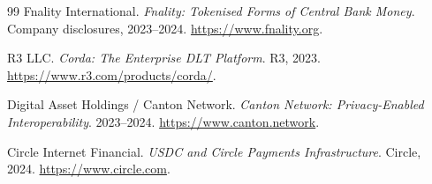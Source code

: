 \documentclass[11pt,a4paper]{article}
\begin{document}
\begin{thebibliography}{99}
Fnality International. \textit{Fnality: Tokenised Forms of Central Bank Money}. Company disclosures, 2023--2024. \url{https://www.fnality.org}.

R3 LLC. \textit{Corda: The Enterprise DLT Platform}. R3, 2023. \url{https://www.r3.com/products/corda/}.

Digital Asset Holdings / Canton Network. \textit{Canton Network: Privacy-Enabled Interoperability}. 2023--2024. \url{https://www.canton.network}.

Circle Internet Financial. \textit{USDC and Circle Payments Infrastructure}. Circle, 2024. \url{https://www.circle.com}.

\end{thebibliography}
\end{document}
